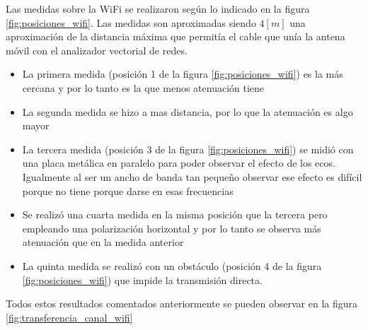 \documentclass[10pt,conference,a4paper]{IEEEtran}
\begin{document}
Las medidas sobre la WiFi se realizaron según lo indicado en la figura \ref{fig:posiciones_wifi}. Las medidas son aproximadas siendo $4[m]$ una aproximación de la distancia máxima que permitía el cable que unía la antena móvil con el analizador vectorial de redes.

\begin{itemize}
    \item La primera medida (posición 1 de la figura \ref{fig:posiciones_wifi}) es la más cercana y por lo tanto es la que menos atenuación tiene
    \item La segunda medida se hizo a mas distancia, por lo que la atenuación es algo mayor 
    \item La tercera medida (posición 3 de la figura \ref{fig:posiciones_wifi}) se midió con una placa metálica en paralelo para poder observar el efecto de los ecos. Igualmente al ser un ancho de banda tan pequeño observar ese efecto es difícil porque no tiene porque darse en esas frecuencias
    \item Se realizó una cuarta medida en la misma posición que la tercera pero empleando una polarización horizontal y por lo tanto se observa más atenuación que en la medida anterior
    \item La quinta medida se realizó con un obstáculo (posición 4 de la figura \ref{fig:posiciones_wifi}) que impide la transmisión directa.
\end{itemize}

Todos estos resultados comentados anteriormente se pueden observar en la figura \ref{fig:transferencia_canal_wifi}
\end{document}
